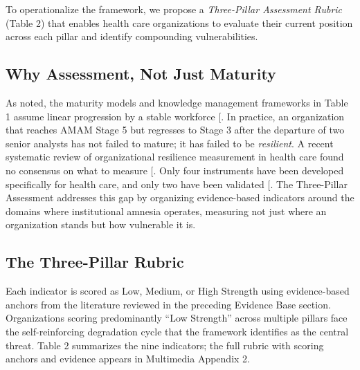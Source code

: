 \documentclass[
  american,
  11pt,
  letterpaper,
  oneside  ,captions=tableheading
]{scrartcl}
\begin{document}
To operationalize the framework, we propose a \emph{Three-Pillar
Assessment Rubric} (Table 2) that enables health care organizations to
evaluate their current position across each pillar and identify
compounding vulnerabilities.

\subsection{Why Assessment, Not Just
Maturity}\label{why-assessment-not-just-maturity}

As noted, the maturity models and knowledge management frameworks in
Table 1 assume linear progression by a stable workforce
{[}\citeproc{ref-himss2024}{1}{]}. In practice, an organization that
reaches AMAM Stage 5 but regresses to Stage 3 after the departure of two
senior analysts has not failed to mature; it has failed to be
\emph{resilient}. A recent systematic review of organizational
resilience measurement in health care found no consensus on what to
measure {[}\citeproc{ref-ignatowicz2023}{65}{]}. Only four instruments
have been developed specifically for health care, and only two have been
validated {[}\citeproc{ref-ratliff2025}{66}{]}. The Three-Pillar
Assessment addresses this gap by organizing evidence-based indicators
around the domains where institutional amnesia operates, measuring not
just where an organization stands but how vulnerable it is.

\subsection{The Three-Pillar Rubric}\label{the-three-pillar-rubric}

Each indicator is scored as Low, Medium, or High Strength using
evidence-based anchors from the literature reviewed in the preceding
Evidence Base section. Organizations scoring predominantly ``Low
Strength'' across multiple pillars face the self-reinforcing degradation
cycle that the framework identifies as the central threat. Table 2
summarizes the nine indicators; the full rubric with scoring anchors and
evidence appears in Multimedia Appendix 2.
\end{document}
